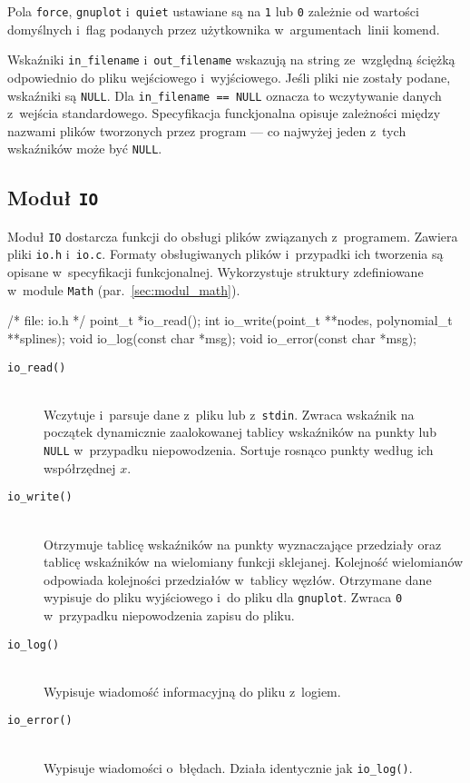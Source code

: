 \documentclass[12pt,a4paper]{article}
\newcommand{\p}[1]{\texttt{#1}}
\begin{document}
Pola \p{force}, \p{gnuplot} i~\p{quiet} ustawiane są na \p{1} lub \p{0}
zależnie od wartości domyślnych i~flag podanych przez użytkownika
w~argumentach~linii komend.

Wskaźniki \p{in\_filename} i~\p{out\_filename} wskazują na string ze~względną
ściężką odpowiednio do pliku wejściowego i~wyjściowego. Jeśli pliki nie
zostały podane, wskaźniki są \p{NULL}. Dla \p{in\_filename == NULL} oznacza to
wczytywanie danych z~wejścia standardowego. Specyfikacja funckjonalna opisuje
zależności między nazwami plików tworzonych przez program --- co najwyżej jeden
z~tych wskaźników może być \p{NULL}.

\subsection{Moduł \p{IO}}

Moduł \p{IO} dostarcza funkcji do obsługi plików związanych z~programem.
Zawiera pliki \p{io.h} i~\p{io.c}. Formaty obsługiwanych plików i~przypadki ich
tworzenia są opisane w~specyfikacji funkcjonalnej. Wykorzystuje struktury
zdefiniowane w~module \p{Math} (par.~\ref{sec:modul_math}).
\begin{SmallVerbatim}
    /* file: io.h */
    point_t *io_read();
    int io_write(point_t **nodes, polynomial_t **splines);
    void io_log(const char *msg);
    void io_error(const char *msg);
\end{SmallVerbatim}
\begin{description}
  \item[\p{io\_read()}] \hfill \\
    Wczytuje i~parsuje dane z~pliku lub z~\p{stdin}. Zwraca wskaźnik na
    początek dynamicznie zaalokowanej tablicy wskaźników na punkty lub \p{NULL}
    w~przypadku niepowodzenia. Sortuje rosnąco punkty według ich współrzędnej
    $x$.
  \item[\p{io\_write()}] \hfill \\
    Otrzymuje tablicę wskaźników na punkty wyznaczające przedziały oraz tablicę
    wskaźników na wielomiany funkcji sklejanej. Kolejność wielomianów odpowiada
    kolejności przedziałów w~tablicy węzłów. Otrzymane dane wypisuje do pliku
    wyjściowego i~do pliku dla \p{gnuplot}. Zwraca \p{0} w~przypadku
    niepowodzenia zapisu do pliku.
  \item[\p{io\_log()}] \hfill \\
    Wypisuje wiadomość informacyjną do pliku z~logiem.
  \item[\p{io\_error()}] \hfill \\
    Wypisuje wiadomości o~błędach. Działa identycznie jak \p{io\_log()}.
\end{description}
\end{document}
